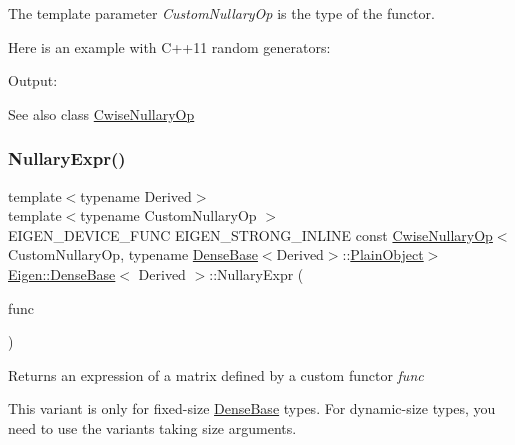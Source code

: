 The template parameter {\itshape Custom\+Nullary\+Op} is the type of the functor.

Here is an example with C++11 random generators\+: 
\begin{DoxyCodeInclude}{0}
\end{DoxyCodeInclude}
 Output\+: 
\begin{DoxyVerbInclude}
\end{DoxyVerbInclude}


\begin{DoxySeeAlso}{See also}
class \mbox{\hyperlink{class_eigen_1_1_cwise_nullary_op}{Cwise\+Nullary\+Op}} 
\end{DoxySeeAlso}
\mbox{\label{class_eigen_1_1_dense_base_a158e2b0e2d8501bf8e85928c0c5eff6d}} 
\subsubsection{\texorpdfstring{NullaryExpr()}{NullaryExpr()}\hspace{0.1cm}{\footnotesize\ttfamily [3/3]}}
{\footnotesize\ttfamily template$<$typename Derived$>$ \\
template$<$typename Custom\+Nullary\+Op $>$ \\
E\+I\+G\+E\+N\+\_\+\+D\+E\+V\+I\+C\+E\+\_\+\+F\+U\+NC E\+I\+G\+E\+N\+\_\+\+S\+T\+R\+O\+N\+G\+\_\+\+I\+N\+L\+I\+NE const \mbox{\hyperlink{class_eigen_1_1_cwise_nullary_op}{Cwise\+Nullary\+Op}}$<$Custom\+Nullary\+Op, typename \mbox{\hyperlink{class_eigen_1_1_dense_base}{Dense\+Base}}$<$Derived$>$\+::\mbox{\hyperlink{class_eigen_1_1_dense_base_aae45af9b5aca5a9caae98fd201f47cc4}{Plain\+Object}}$>$ \mbox{\hyperlink{class_eigen_1_1_dense_base}{Eigen\+::\+Dense\+Base}}$<$ Derived $>$\+::Nullary\+Expr (\begin{DoxyParamCaption}\item[{const Custom\+Nullary\+Op \&}]{func }\end{DoxyParamCaption})}

\begin{DoxyReturn}{Returns}
an expression of a matrix defined by a custom functor {\itshape func} 
\end{DoxyReturn}
This variant is only for fixed-\/size \mbox{\hyperlink{class_eigen_1_1_dense_base}{Dense\+Base}} types. For dynamic-\/size types, you need to use the variants taking size arguments.

